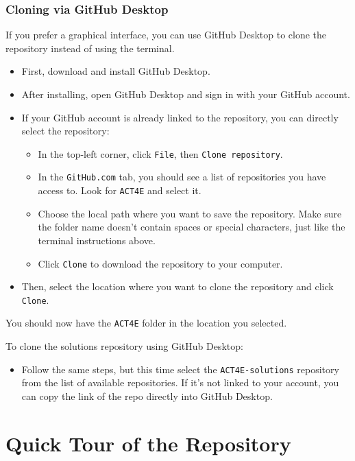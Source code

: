 \documentclass{article}
\begin{document}
    \subsubsection{Cloning via GitHub Desktop}
    If you prefer a graphical interface, you can use GitHub Desktop to clone the repository instead of using the terminal.
    \begin{itemize}
        \item First, download and install GitHub Desktop.
        \item After installing, open GitHub Desktop and sign in with your GitHub account.
        \item If your GitHub account is already linked to the repository, you can directly select the repository: \begin{itemize}
                  \item In the top-left corner, click \texttt{File}, then \texttt{Clone repository}.
                  \item In the \texttt{GitHub.com} tab, you should see a list of repositories you have access to.
                        Look for \texttt{ACT4E} and select it.
                  \item Choose the local path where you want to save the repository.
                        Make sure the folder name doesn't contain spaces or special characters, just like the terminal instructions above.
                  \item Click \texttt{Clone} to download the repository to your computer. \end{itemize}
        \item Then, select the location where you want to clone the repository and click \texttt{Clone}.
    \end{itemize}

    You should now have the \texttt{ACT4E} folder in the location you selected.

    To clone the solutions repository using GitHub Desktop:
    \begin{itemize}
        \item Follow the same steps, but this time select the \texttt{ACT4E-solutions} repository from the list of available repositories.
              If it’s not linked to your account, you can copy the link of the repo directly into GitHub Desktop.
    \end{itemize}

    \section{Quick Tour of the Repository}
\end{document}
